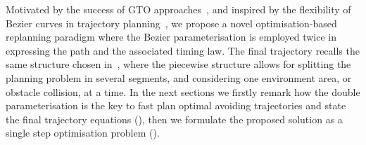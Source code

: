 Motivated by the success of GTO approaches~\cite{zhou2020robust, oleynikova2016continuous, gao2017gradient, usenko2017real}, and inspired by
the flexibility of B\acuteacc ezier curves in trajectory planning~\cite{gao2019flying, mehdi2015collision, park2020efficient}, we propose
a novel optimisation-based replanning paradigm where the B\acuteacc ezier parameterisation is employed twice in expressing the path and the associated timing law.
The final trajectory recalls the same structure chosen in~, where the piecewise
structure allows for splitting the planning problem in several segments, and considering one environment area, or obstacle collision, at a time.
In the next sections we firstly remark how the double parameterisation is the key to fast plan optimal avoiding trajectories and state 
the final trajectory equations (), then we formulate the proposed solution as a single step optimisation
problem ().

